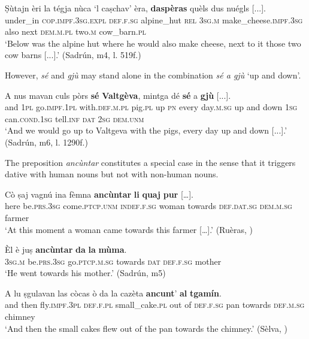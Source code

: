 \ea

\gll Ṣùtajn èri la tégja nùca `l caṣchav' èra, \textbf{daspèras} quèls dus nuégls [...].\\
under\_in \textsc{cop.impf.3sg.expl} \textsc{def.f.sg} alpine\_hut \textsc{rel} \textsc{3sg.m} make\_cheese.\textsc{impf.3sg} also next \textsc{dem.m.pl} two.\textsc{m} cow\_barn.\textsc{pl} \\
\glt `Below was the alpine hut where he would also make cheese, next to it those two cow barns [...].' (Sadrún, m4, l. 519f.)
\z

However, \textit{sé} and \textit{gjù} may stand alone in the combination \textit{sé a gjù} `up and down'.

\ea

\gll    A nus mavan culs pòrs \textbf{sé} \textbf{Valtgèva}, mintga dé \textbf{sé} a \textbf{gjù} [...].\\
and\textbf{} \textsc{1pl}  go.\textsc{impf.1pl} with.\textsc{def.m.pl} pig.\textsc{pl} up \textsc{pn} every day.\textsc{m.sg} up and down  \textsc{1sg}  can.\textsc{cond.1sg}  tell.\textsc{inf}  \textsc{dat}  \textsc{2sg} \textsc{dem.unm}\\
\glt `And we would go up to Valtgeva with the pigs, every day up and down [...].' (Sadrún, m6, l. 1290f.)
\z

The preposition \textit{ancùntar} constitutes a special case in the sense that it triggers dative with human nouns but not with non-human nouns.

\ea

\gll Cò ṣaj	vagnú ina fèmna \textbf{ancùntar} \textbf{li}	\textbf{quaj} \textbf{pur} […].\\
here be.\textsc{prs.3sg} come.\textsc{ptcp.unm} \textsc{indef.f.sg} woman towards \textsc{def.dat.sg} \textsc{dem.m.sg} farmer \\
\glt `At this moment a woman came towards this farmer […].' (Ruèras, \citealt[64]{Büchli1966})
\z

\ea

\gll Èl è juṣ \textbf{ancùntar} \textbf{da} \textbf{la} \textbf{mùma}.\\
\textsc{3sg.m} be.\textsc{prs.3sg} go.\textsc{ptcp.m.sg} towards \textsc{dat} \textsc{def.f.sg} mother\\
\glt `He went towards his mother.' (Sadrún, m5)
\z

\ea

\gll A lu ṣgulavan las còcas ò da la cazèta \textbf{ancunt}' \textbf{al} \textbf{tgamín}.\\
and then fly.\textsc{impf.3pl} \textsc{def.f.pl} small\_cake.\textsc{pl} out of \textsc{def.f.sg} pan towards \textsc{def.m.sg} chimney\\
\glt `And then the small cakes flew out of the pan towards the chimney.' (Sèlva, \citealt[26]{Büchli1966})
\z

